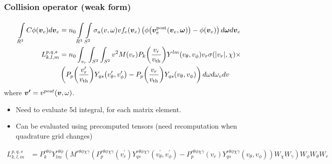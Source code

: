 \documentclass[mathserif, aspectratio=169]{beamer}
\newcommand{\vect}[1]{\boldsymbol{#1}}
\newcommand{\of}[1]{\mleft( #1 \mright)}
\newcommand{\vth}{v_{\textrm{th}}}
\newcommand{\myint}[2]{\int\limits_{#1}^{#2}}
\begin{document}
	\begin{frame}
		\frametitle{Collision operator (weak form)}
		\small{
		\begin{align*}
			\myint{R^3}{} C \phi\of{\vect{v}_e} d{\vect{v}_e} 
		 	&=
			n_0 \myint{R^3}{} \myint{S^2}{}
			\sigma_a(v,\omega) v 
			f_e\of{\vect{v}_e} \left(
			\phi\of{\vect{v}_e^\text{post}\of{\vect{v}_e,\vect{\omega}}} 
			- \phi\of{\vect{v}_e} 
			\right) d{\vect{\omega}}
			d{\vect{v}_e}  \\
			{L}_{k,l,m}^{p,q,s} &= n_0 \int_{v_r} \int_{S^2} \int_{S^2}  
			v^2 M(v_r) P_k \of{\frac{v_r}{\vth}} Y^{lm}\of{v_\theta, v_\phi} v_r\sigma(|v_r|,\chi) \times \\ & \left(
				P_p\of{\frac{v^{\prime}_r}{\vth}} Y_{qs}\of{v^{\prime}_\theta, v^{\prime}_\phi} - 
				P_p\of{\frac{v_r}{\vth}} Y_{qs}\of{v_\theta, v_\phi}
			\right) d\omega d\omega_v dv \\
		\end{align*} where $\vect{v^{\prime}} = v^{post}\of{\vect{v},\omega}$.
		}
		\begin{itemize}
			\item Need to evaluate 5d integral, for each matrix element. 
			\item Can be evaluated using precomputed tensors (need recomputation when quadrature grid changes)
		\end{itemize}
		\tiny
		{
			\begin{align*}
				{L}_{k,l,m}^{p,q,s} &=P^{r\theta\phi}_{k} Y_{lm}^{r\theta\phi} \left( M^{r\theta\phi\chi\gamma} \left(P^{r\theta\phi\chi\gamma}_{p} (v^\prime_r)	Y^{r\theta\phi\chi\gamma}_{qs} (v^\prime_\theta,v^{\prime}_\phi) - P^{r\theta\phi\chi\gamma}_{p} (v_r)	Y^{r\theta\phi\chi\gamma}_{qs} (v_\theta,v_\phi) \right) W_\chi W_\gamma \right) W_\phi W_\theta W_r
			\end{align*}
		}%
	\end{frame}
\end{document}

